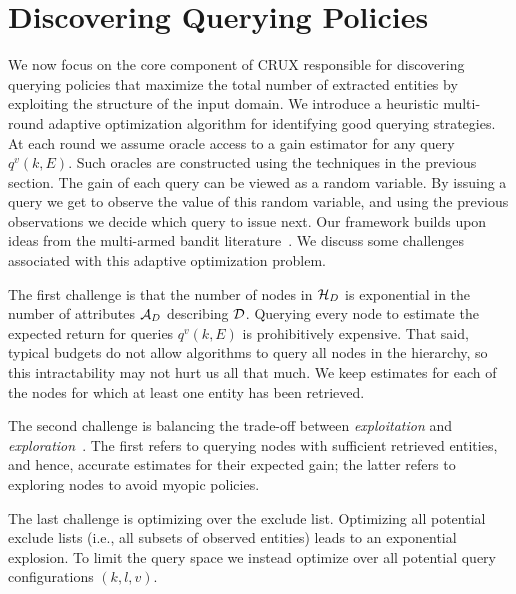 

\section{Discovering Querying Policies}
\label{sec:solving}
We now focus on the core component of CRUX responsible for discovering querying policies that maximize the total number of extracted entities by exploiting the structure of the input domain.  We introduce a heuristic multi-round adaptive optimization algorithm for identifying good querying strategies. At each round we assume oracle access to a gain estimator for any query $q^v(k,E)$. Such oracles are constructed using the techniques in the previous section. The gain of each query can be viewed as a random variable. By issuing a query we get to observe the value of this random variable, and using the previous observations we decide which query to issue next. Our framework builds upon ideas from the multi-armed bandit literature~\cite{Auer:2003,EvenDar06actionelimination}. We discuss some challenges associated with this adaptive optimization problem.

\squishlist
\item The first challenge is that the number of nodes in $\mathcal{H}_D$ is exponential in the number of attributes $\mathcal{A}_D$ describing $\mathcal{D}$. Querying every node to estimate the expected return for queries $q^v(k,E)$ is prohibitively expensive. That said, typical budgets do not allow algorithms to query all nodes in the hierarchy, so this intractability may not hurt us all that much. We keep estimates for each of the nodes for which at least one entity has been retrieved.
\item The second challenge is balancing the trade-off between {\em exploitation} and {\em exploration}~\cite{Auer:2003}. The first refers to querying nodes with sufficient retrieved entities, and hence, accurate estimates for their expected gain; the latter refers to exploring nodes to avoid myopic policies.
\item The last challenge is optimizing over the exclude list. Optimizing all potential exclude lists (i.e., all subsets of observed entities) leads to an exponential explosion. To limit the query space we instead optimize over all potential query configurations $(k,l,v)$.
\squishend

